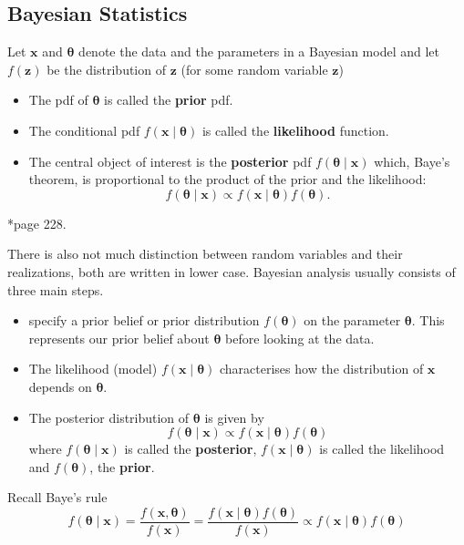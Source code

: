\subsection*{Bayesian Statistics}

\begin{defe} \label{defe: prior_likeli_postr}
    Let $\bm{x}$ and $\bm{\theta}$ denote the data and the parameters in a Bayesian model and let $f(\bm{z})$ be the distribution of $\bm{z}$ (for some random variable $\bm{z}$)
    \begin{itemize}
        \item The pdf of $\bm{\theta}$ is called the {\bf prior} pdf.
        \item The conditional pdf $f(\bm{x} \mid \bm{\theta})$ is called the {\bf likelihood} function.
        \item The central object of interest is the {\bf posterior} pdf $f (\bm{\theta} \mid \bm{x})$ which, Baye's theorem, is proportional to the product of the prior and the likelihood:
              \[
                  f (\bm{\theta} \mid \bm{x}) \propto f(\bm{x} \mid \bm{\theta}) f(\bm{\theta}).
              \]
    \end{itemize}
    \cite{KroeseDirkP2013SMaC}*{page 228}.
\end{defe}

There is also not much distinction between random variables and their realizations, both are written in lower case. Bayesian analysis usually consists of three main steps.

\begin{itemize}
    \item specify a prior belief or prior distribution $f(\bm{\theta})$ on the parameter $\bm{\theta}$. This represents our prior belief about $\bm{\theta}$ before looking at the data.
    \item The likelihood (model) $f (\bm{x} \mid \bm{\theta})$ characterises how the distribution of $\bm{x}$ depends on $\bm{\theta}$.
    \item The posterior distribution of $\bm{\theta}$ is given by
          \[
              f (\bm{\theta} \mid \bm{x}) \propto f(\bm{x} \mid \bm{\theta}) f(\bm{\theta})
          \]
          where $f (\bm{\theta} \mid \bm{x})$ is called the {\bf posterior}, $f(\bm{x} \mid \bm{\theta})$ is called the likelihood and $f(\bm{\theta})$, the {\bf prior}.
\end{itemize}

Recall Baye's rule
\[
    f (\bm{\theta} \mid \bm{x}) = \frac{f(\bm{x},\bm{\theta})}{f(\bm{x})} = \frac{f(\bm{x} \mid \bm{\theta}) f(\bm{\theta})}{f(\bm{x})} \propto f(\bm{x} \mid \bm{\theta}) f(\bm{\theta})
\]

